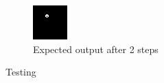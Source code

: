 \documentclass[12pt,a4paper]{article}
\begin{document}
\begin{figure}[h!]
\begin{subfigure}[b]{0.5\textwidth}
                \includegraphics[width=\textwidth]{../test/test1-step2}
                \caption{Expected output after 2 steps}
                \label{fig:r2out}
        \end{subfigure}
        \caption{\label{fig:testing}Testing}
\end{figure}
\end{document}
